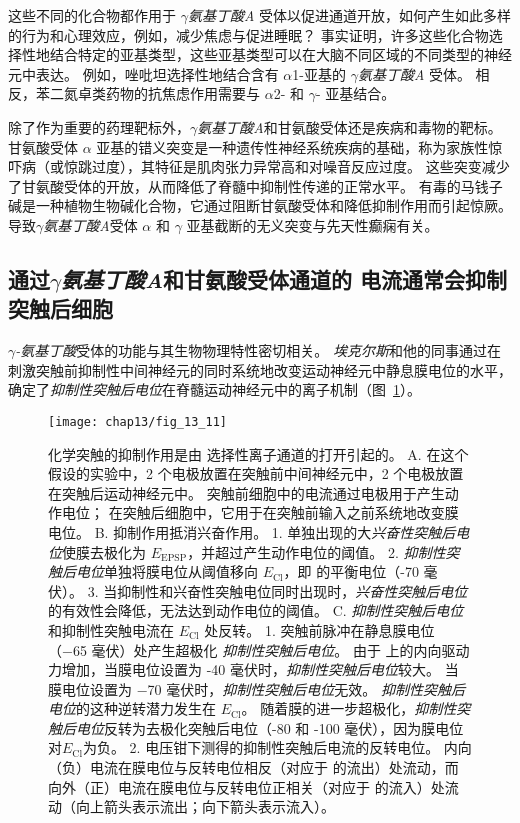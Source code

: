这些不同的化合物都作用于 \textit{$\gamma$氨基丁酸A} 受体以促进通道开放，如何产生如此多样的行为和心理效应，例如，减少焦虑与促进睡眠？
事实证明，许多这些化合物选择性地结合特定的亚基类型，这些亚基类型可以在大脑不同区域的不同类型的神经元中表达。
例如，唑吡坦选择性地结合含有 $\alpha$1-亚基的 \textit{$\gamma$氨基丁酸A} 受体。
相反，苯二氮卓类药物的抗焦虑作用需要与 $\alpha$2- 和 $\gamma$- 亚基结合。


除了作为重要的药理靶标外，\textit{$\gamma$氨基丁酸A}和甘氨酸受体还是疾病和毒物的靶标。
甘氨酸受体 $\alpha$ 亚基的错义突变是一种遗传性神经系统疾病的基础，称为家族性惊吓病（或惊跳过度），其特征是肌肉张力异常高和对噪音反应过度。
这些突变减少了甘氨酸受体的开放，从而降低了脊髓中抑制性传递的正常水平。
有毒的马钱子碱是一种植物生物碱化合物，它通过阻断甘氨酸受体和降低抑制作用而引起惊厥。
导致\textit{$\gamma$氨基丁酸A}受体 $\alpha$ 和 $\gamma$ 亚基截断的无义突变与先天性癫痫有关。



\subsection{通过\textit{$\gamma$氨基丁酸A}和甘氨酸受体通道的  电流通常会抑制突触后细胞}

\textit{$\gamma$-氨基丁酸}受体的功能与其生物物理特性密切相关。
\textit{埃克尔斯}和他的同事通过在刺激突触前抑制性中间神经元的同时系统地改变运动神经元中静息膜电位的水平，确定了\textit{抑制性突触后电位}在脊髓运动神经元中的离子机制（图~\ref{fig:13_11}）。


\begin{figure}[htbp]
	\centering
	\texttt{[image: chap13/fig\_13\_11]}
	\caption{化学突触的抑制作用是由  选择性离子通道的打开引起的。
		A. 在这个假设的实验中，2 个电极放置在突触前中间神经元中，2 个电极放置在突触后运动神经元中。
		突触前细胞中的电流通过电极用于产生动作电位；
		在突触后细胞中，它用于在突触前输入之前系统地改变膜电位。
		B. 抑制作用抵消兴奋作用。
		1. 单独出现的大\textit{兴奋性突触后电位}使膜去极化为 $E_{\text{EPSP}}$，并超过产生动作电位的阈值。
		2. \textit{抑制性突触后电位}单独将膜电位从阈值移向 $E_\text{Cl}$，即  的平衡电位（-70 毫伏）。
		3. 当抑制性和兴奋性突触电位同时出现时，\textit{兴奋性突触后电位}的有效性会降低，无法达到动作电位的阈值。
		C. \textit{抑制性突触后电位}和抑制性突触电流在 $E_\text{Cl}$ 处反转。
		1. 突触前脉冲在静息膜电位（−65 毫伏）处产生超极化 \textit{抑制性突触后电位}。
		由于  上的内向驱动力增加，当膜电位设置为 -40 毫伏时，\textit{抑制性突触后电位}较大。
		当膜电位设置为 −70 毫伏时，\textit{抑制性突触后电位}无效。
		\textit{抑制性突触后电位}的这种逆转潜力发生在 $E_\text{Cl}$。
		随着膜的进一步超极化，\textit{抑制性突触后电位}反转为去极化突触后电位（-80 和 -100 毫伏），因为膜电位对$E_\text{Cl}$为负。
		2. 电压钳下测得的抑制性突触后电流的反转电位。
		内向（负）电流在膜电位与反转电位相反（对应于  的流出）处流动，而向外（正）电流在膜电位与反转电位正相关（对应于  的流入）处流动（向上箭头表示流出；向下箭头表示流入）。}
	\label{fig:13_11}
\end{figure}


